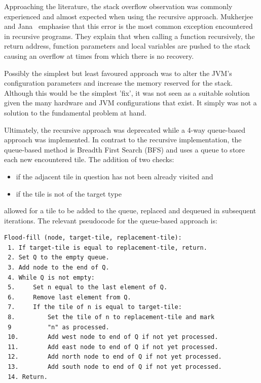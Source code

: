 Approaching the literature, the stack overflow observation was commonly experienced and almost expected when using the recursive approach.  Mukherjee and Jana~\cite{mukherjeJana2010} emphasise that this error is the most common exception encountered in recursive programs. They explain that when calling a function recursively, the return address, function parameters and local variables are pushed to the stack causing an overflow at times from which there is no recovery.
 
Possibly the simplest but least favoured approach was to alter the JVM's configuration parameters and increase the memory reserved for the stack.  Although this would be the simplest 'fix', it was not seen as a suitable solution given the many hardware and JVM configurations that exist. It simply was not a solution to the fundamental problem at hand.

Ultimately, the recursive approach was deprecated while a 4-way queue-based approach was implemented.  In contrast to the recursive implementation, the queue-based method is Breadth First Search (BFS) and uses a queue to store each new encountered tile.  The addition of two checks:

\begin{itemize}
  \item if the adjacent tile in question has not been already visited and
  \item if the tile is not of the target type
\end{itemize}

allowed for a tile to be added to the queue, replaced and dequeued in subsequent iterations. The relevant pseudocode for the queue-based approach is:

\begin{minipage}{0.9\textwidth}
	\begin{lstlisting}[caption={4-way queue-based flood fill~\cite{codecodex2015}}, label={lst:queueFloodFill}]
Flood-fill (node, target-tile, replacement-tile):
 1. If target-tile is equal to replacement-tile, return.
 2. Set Q to the empty queue.
 3. Add node to the end of Q.
 4. While Q is not empty: 
 5.     Set n equal to the last element of Q.
 6.     Remove last element from Q.
 7.     If the tile of n is equal to target-tile:
 8.         Set the tile of n to replacement-tile and mark 
 9			"n" as processed.
 10.        Add west node to end of Q if not yet processed.
 11.        Add east node to end of Q if not yet processed.
 12.        Add north node to end of Q if not yet processed.
 13.        Add south node to end of Q if not yet processed.
 14. Return.
	\end{lstlisting}
\end{minipage}

